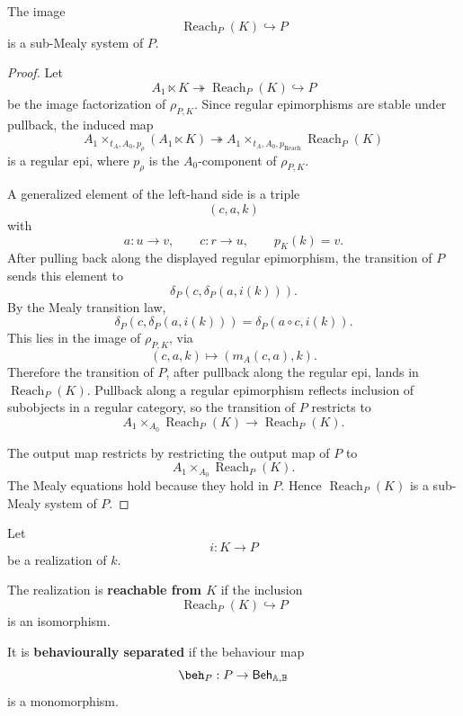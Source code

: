 \begin{proposition}
\label{prop:reachable-part-submealy}
The image
\[
\operatorname{Reach}_P(K)\hookrightarrow P
\]
is a sub-Mealy system of \(P\).
\end{proposition}

\begin{proof}
Let
\[
A_1\ltimes K
\twoheadrightarrow
\operatorname{Reach}_P(K)
\hookrightarrow
P
\]
be the image factorization of \(\rho_{P,K}\). Since regular epimorphisms are
stable under pullback, the induced map
\[
A_1\times_{t_A,A_0,p_\rho}(A_1\ltimes K)
\twoheadrightarrow
A_1\times_{t_A,A_0,p_{\operatorname{Reach}}}
\operatorname{Reach}_P(K)
\]
is a regular epi, where \(p_\rho\) is the \(A_0\)-component of
\(\rho_{P,K}\).

A generalized element of the left-hand side is a triple
\[
(c,a,k)
\]
with
\[
a:u\to v,
\qquad
c:r\to u,
\qquad
p_K(k)=v.
\]
After pulling back along the displayed regular epimorphism, the transition of
\(P\) sends this element to
\[
\delta_P(c,\delta_P(a,i(k))).
\]
By the Mealy transition law,
\[
\delta_P(c,\delta_P(a,i(k)))
=
\delta_P(a\circ c,i(k)).
\]
This lies in the image of \(\rho_{P,K}\), via
\[
(c,a,k)\longmapsto (m_A(c,a),k).
\]
Therefore the transition of \(P\), after pullback along the regular epi,
lands in \(\operatorname{Reach}_P(K)\). Pullback along a regular epimorphism
reflects inclusion of subobjects in a regular category, so the transition of
\(P\) restricts to
\[
A_1\times_{A_0}\operatorname{Reach}_P(K)
\to
\operatorname{Reach}_P(K).
\]

The output map restricts by restricting the output map of \(P\) to
\[
A_1\times_{A_0}\operatorname{Reach}_P(K).
\]
The Mealy equations hold because they hold in \(P\). Hence
\(\operatorname{Reach}_P(K)\) is a sub-Mealy system of \(P\).
\end{proof}

\begin{definition}
\label{def:reachable-separated-realization}
Let
\[
i:K\to P
\]
be a realization of \(k\).

The realization is \textbf{reachable from \(K\)} if the inclusion
\[
\operatorname{Reach}_P(K)\hookrightarrow P
\]
is an isomorphism.

It is \textbf{behaviourally separated} if the behaviour map
\[
\beh_P:P\to\mathsf{Beh}_{\mathbb A,\mathbb B}
\]
is a monomorphism.
\end{definition}

